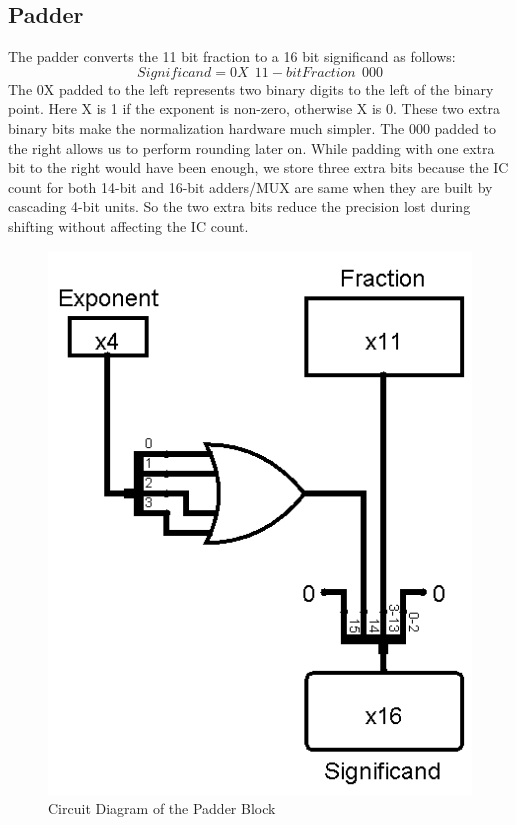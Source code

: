 \documentclass[12pt, a4paper]{article}
\begin{document}
	\subsection{Padder}
	The padder converts the 11 bit fraction to a 16 bit significand
	as follows:
	$$Significand = 0X\;\,11\!-\!bitFraction\;\,000$$
	The 0X padded to the left represents two binary digits to the left
	of the binary point. Here X is 1 if the exponent is non-zero, otherwise X
	is 0. These two extra binary bits make the normalization hardware much
	simpler.
	The 000 padded to the right allows us to perform rounding later on. While
	padding with one extra bit to the right would have been enough, we store
	three extra bits because the IC count for both 14-bit and 16-bit adders/MUX
	are same when they are built by cascading 4-bit units. So the two extra bits
	reduce the precision lost during shifting without affecting the IC count.
	\begin{figure}[h!]
		\centering
		\includegraphics[scale = 0.3]{padder}
		\caption{Circuit Diagram of the Padder Block}
		\label{fig5}
	\end{figure}
\end{document}

